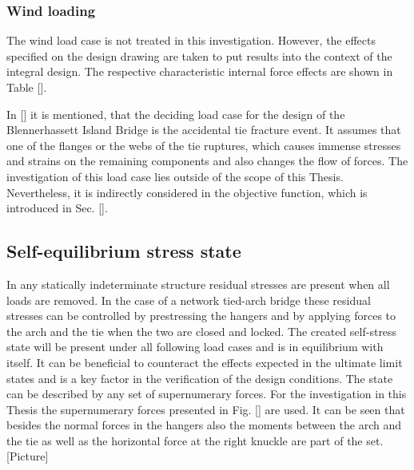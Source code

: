 \subsubsection{Wind loading}
The wind load case is not treated in this investigation. However, the effects specified on the design drawing are taken to put results into the context of the integral design. The respective characteristic internal force effects are shown in Table [].



In [] it is mentioned, that the deciding load case for the design of the Blennerhassett Island Bridge is the accidental tie fracture event. It assumes that one of the flanges or the webs of the tie ruptures, which causes immense stresses and strains on the remaining components and also changes the flow of forces. The investigation of this load case lies outside of the scope of this Thesis. Nevertheless, it is indirectly considered in the objective function, which is introduced in Sec. [].

\newpage
\subsection{Self-equilibrium stress state} \label{sec:met_seq}
In any statically indeterminate structure residual stresses are present when all loads are removed. In the case of a network tied-arch bridge these residual stresses can be controlled by prestressing the hangers and by applying forces to the arch and the tie when the two are closed and locked. The created self-stress state will be present under all following load cases and is in equilibrium with itself. It can be beneficial to counteract the effects expected in the ultimate limit states and is a key factor in the verification of the design conditions. The state can be described by any set of supernumerary forces. For the investigation in this Thesis the supernumerary forces presented in Fig. [] are used. It can be seen that besides the normal forces in the hangers also the moments between the arch and the tie as well as the horizontal force at the right knuckle are part of the set.\\

[Picture]\\

